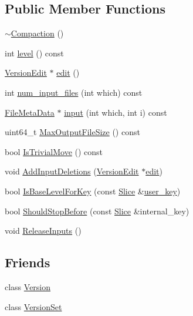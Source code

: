 \subsection*{Public Member Functions}
\begin{DoxyCompactItemize}
\item 
\mbox{\hyperlink{classleveldb_1_1_compaction_ad29d60feea9dd53f54a2bd9301dbd9c4}{$\sim$\+Compaction}} ()
\item 
int \mbox{\hyperlink{classleveldb_1_1_compaction_a716f0b644cf403944db14e7622519bd3}{level}} () const
\item 
\mbox{\hyperlink{classleveldb_1_1_version_edit}{Version\+Edit}} $\ast$ \mbox{\hyperlink{classleveldb_1_1_compaction_a122e4f7b4fdb6c0d1862624742b34b3d}{edit}} ()
\item 
int \mbox{\hyperlink{classleveldb_1_1_compaction_a701f2fa2d3fb00af0847aa570506e743}{num\+\_\+input\+\_\+files}} (int which) const
\item 
\mbox{\hyperlink{structleveldb_1_1_file_meta_data}{File\+Meta\+Data}} $\ast$ \mbox{\hyperlink{classleveldb_1_1_compaction_aa0999bbaeb6993759b3e76e3516589d3}{input}} (int which, int i) const
\item 
uint64\+\_\+t \mbox{\hyperlink{classleveldb_1_1_compaction_ad4487eda793d622dbcf0483663fef2ed}{Max\+Output\+File\+Size}} () const
\item 
bool \mbox{\hyperlink{classleveldb_1_1_compaction_a85ab53d400d49d1dfb7e8f63017fef99}{Is\+Trivial\+Move}} () const
\item 
void \mbox{\hyperlink{classleveldb_1_1_compaction_abb1acdc9b882a7497603b13386e7e1a7}{Add\+Input\+Deletions}} (\mbox{\hyperlink{classleveldb_1_1_version_edit}{Version\+Edit}} $\ast$\mbox{\hyperlink{classleveldb_1_1_compaction_a122e4f7b4fdb6c0d1862624742b34b3d}{edit}})
\item 
bool \mbox{\hyperlink{classleveldb_1_1_compaction_ae982beb6ee52d92de76a363ef0eefc29}{Is\+Base\+Level\+For\+Key}} (const \mbox{\hyperlink{classleveldb_1_1_slice}{Slice}} \&\mbox{\hyperlink{version__set_8cc_afced2118ae0bf03db7c7e75a21cfd004}{user\+\_\+key}})
\item 
bool \mbox{\hyperlink{classleveldb_1_1_compaction_a07624423bb512fedb358a008a38fa0b9}{Should\+Stop\+Before}} (const \mbox{\hyperlink{classleveldb_1_1_slice}{Slice}} \&internal\+\_\+key)
\item 
void \mbox{\hyperlink{classleveldb_1_1_compaction_a87ec90747d22dce0d103149db1ecf709}{Release\+Inputs}} ()
\end{DoxyCompactItemize}
\subsection*{Friends}
\begin{DoxyCompactItemize}
\item 
class \mbox{\hyperlink{classleveldb_1_1_compaction_ace162f32d4abb584945d3a55a389b0a3}{Version}}
\item 
class \mbox{\hyperlink{classleveldb_1_1_compaction_a1827cd1b4d6e9e3c378ce37ca3cce635}{Version\+Set}}
\end{DoxyCompactItemize}


